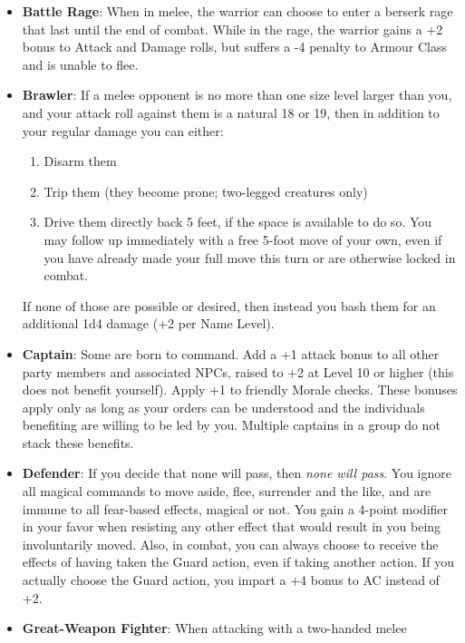 \documentclass{book}
\providecommand{\tightlist}{%
\setlength{\itemsep}{0pt}\setlength{\parskip}{0pt}}
\begin{document}
\begin{itemize}
\tightlist
\item
  \textbf{Battle Rage}: When in melee, the warrior can choose to enter a
  berserk rage that last until the end of combat. While in the rage, the
  warrior gains a +2 bonus to Attack and Damage rolls, but suffers a -4
  penalty to Armour Class and is unable to flee.
\item
  \textbf{Brawler}: If a melee opponent is no more than one size
  level larger than you, and your attack roll against them is a natural
  18 or 19, then in addition to your regular damage you can either:

  \begin{enumerate}
  \def\labelenumi{\arabic{enumi}.}
  \tightlist
  \item
    Disarm them
  \item
    Trip them (they become prone; two-legged creatures only)
  \item
    Drive them directly back 5 feet, if the space is available to do so.
    You may follow up immediately with a free 5-foot move of your own,
    even if you have already made your full move this turn or are
    otherwise locked in combat.
  \end{enumerate}
  If none of those are possible or desired, then instead you bash them
  for an additional 1d4 damage (+2 per Name Level).
\item
  \textbf{Captain}: Some are born to command. Add a +1 attack bonus to
  all other party members and associated NPCs, raised to +2 at Level 10
  or higher (this does not benefit yourself). Apply +1 to friendly
  Morale checks. These bonuses apply only as long as your orders can be
  understood and the individuals benefiting are willing to be led by
  you. Multiple captains in a group do not stack these benefits.
\item
  \textbf{Defender}: If you decide that none will pass, then \emph{none
  will pass}. You ignore all magical commands to move aside, flee,
  surrender and the like, and are immune to all fear-based effects,
  magical or not. You gain a 4-point modifier in your favor when
  resisting any other effect that would result in you being
  involuntarily moved. Also, in combat, you can always choose to receive
  the effects of having taken the Guard action, even if taking another
  action. If you actually choose the Guard action, you impart a +4 bonus
  to AC instead of +2.
\item
  \textbf{Great-Weapon Fighter}: When attacking with a two-handed melee

\end{itemize}
\end{document}
